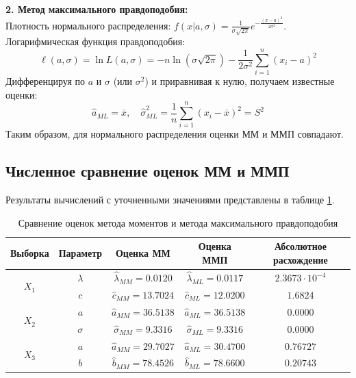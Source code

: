 \documentclass[a4paper,12pt]{article}
\begin{document}
\textbf{2. Метод максимального правдоподобия:}\\
Плотность нормального распределения: $f(x|a,\sigma) = \frac{1}{\sigma\sqrt{2\pi}} e^{-\frac{(x-a)^2}{2\sigma^2}}$.\\
Логарифмическая функция правдоподобия:
$$
\ell(a,\sigma) = \ln L(a, \sigma) = -n \ln(\sigma\sqrt{2\pi}) - \frac{1}{2\sigma^2}\sum_{i=1}^{n}(x_i-a)^2
$$
Дифференцируя по $a$ и $\sigma$ (или $\sigma^2$) и приравнивая к нулю, получаем известные оценки:
$$
\hat{a}_{ML} = \overline{x}, \quad \hat{\sigma}_{ML}^2 = \frac{1}{n}\sum_{i=1}^{n}(x_i-\overline{x})^2 = S^2
$$
Таким образом, для нормального распределения оценки ММ и ММП совпадают.

\subsection{Численное сравнение оценок ММ и ММП}

Результаты вычислений с уточненными значениями представлены в таблице \ref{tab:estimates}.

\begin{table}[H]
\centering
\begin{tabular}{|c|c|c|c|c|}
\hline
Выборка & Параметр & Оценка ММ & Оценка ММП & Абсолютное расхождение \\ \hline
\multirow{2}{*}{$X_1$} & $\lambda$ & $\hat{\lambda}_{MM} = 0.0120$ & $\hat{\lambda}_{ML} = 0.0117$ & $2.3673 \cdot 10^{-4}$ \\
                       & $c$       & $\hat{c}_{MM} = 13.7024$      & $\hat{c}_{ML} = 12.0200$      & $1.6824$ \\ \hline
\multirow{2}{*}{$X_2$} & $a$       & $\hat{a}_{MM} = 36.5138$      & $\hat{a}_{ML} = 36.5138$      & $0.0000$ \\
                       & $\sigma$  & $\hat{\sigma}_{MM} = 9.3316$  & $\hat{\sigma}_{ML} = 9.3316$  & $0.0000$ \\ \hline
\multirow{2}{*}{$X_3$} & $a$       & $\hat{a}_{MM} = 29.7027$      & $\hat{a}_{ML} = 30.4700$      & $0.76727$ \\
                       & $b$       & $\hat{b}_{MM} = 78.4526$      & $\hat{b}_{ML} = 78.6600$      & $0.20743$ \\ \hline
\end{tabular}
\caption{Сравнение оценок метода моментов и метода максимального правдоподобия}
\label{tab:estimates}
\end{table}
\end{document}
